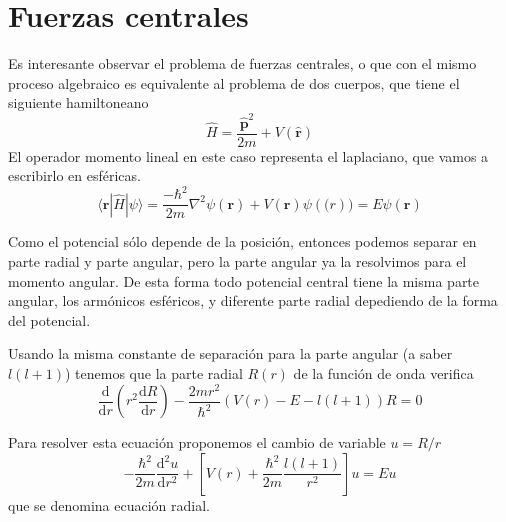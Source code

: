 \section{Fuerzas centrales}
Es interesante observar el problema de fuerzas centrales, o que con el mismo proceso algebraico es equivalente al problema de dos cuerpos, que tiene el siguiente hamiltoneano
\begin{equation}
    \hat{H} = \frac{\hat{\boldsymbol{p}}^2}{2m} + V(\hat{\boldsymbol{r}})
\end{equation}
El operador momento lineal en este caso representa el laplaciano, que vamos a escribirlo en esféricas.
\begin{equation}
    \langle \boldsymbol{r}|\hat{H}|\psi\rangle = \frac{-\hbar^2}{2m} \nabla^2 \psi(\boldsymbol{r}) + V(\textbf{r}) \psi(\boldsymbol(r)) = E \psi(\textbf{r}) 
\end{equation}

Como el potencial sólo depende de la posición, entonces podemos separar en parte radial y parte angular, pero la parte angular ya la resolvimos para el momento angular.
De esta forma todo potencial central tiene la misma parte angular, los armónicos esféricos, y diferente parte radial depediendo de la forma del potencial.

Usando la misma constante de separación para la parte angular (a saber $l (l + 1)$) tenemos que la parte radial $R(r)$ de la función de onda verifica
\begin{equation}
    \frac{\mathrm{d}}{\mathrm{d}r} \left(r^2 \frac{\mathrm{d} R}{\mathrm{d}r} \right) - \frac{2 m r^2}{\hbar^2} (V(r) - E - l(l + 1)) R = 0
\end{equation}

Para resolver esta ecuación proponemos el cambio de variable $u = R/r$
\begin{equation}
    -\frac{\hbar^2}{2m} \frac{\mathrm{d}^2 u}{\mathrm{d}r^2} + \left[ V(r) + \frac{\hbar^2}{2m} \frac{l (l + 1)}{r^2} \right] u = E u
    \label{eq:central_ec_radial}
\end{equation}
que se denomina ecuación radial.


